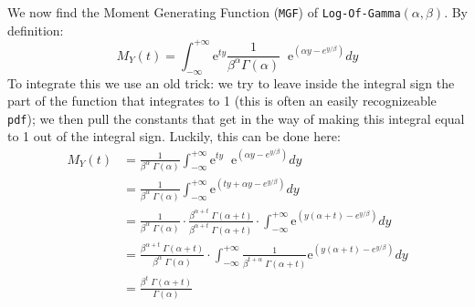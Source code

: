 \documentclass[12pt]{article}
\begin{document}
We now find the Moment Generating Function (\texttt{MGF}) of \texttt{Log-Of-Gamma}$(\alpha, \beta)$. By definition:
$$
M_Y(t) = \int_{-\infty}^{+\infty} \mathrm{e}^{ty} \frac{1}{\beta^\alpha \Gamma(\alpha)} \;\; \mathrm{e}^{\left(\alpha y - e^{y/\beta}\right)} dy
$$
To integrate this we use an old trick: we try to leave inside the integral sign the part of the function that integrates to 1 (this is often an easily recognizeable \texttt{pdf}); we then pull the constants that get in the way of making this integral equal to 1 out of the integral sign. Luckily, this can be done here:
\begin{align*}
M_Y(t) &= \frac{1}{\beta^\alpha \; \Gamma(\alpha)} \int_{-\infty}^{+\infty} \mathrm{e}^{ty} \;\; \mathrm{e}^{\left(\alpha y - e^{y/\beta}\right)} dy\\
&= \frac{1}{\beta^\alpha \; \Gamma(\alpha)} \int_{-\infty}^{+\infty} \mathrm{e}^{\left(ty +\alpha y - e^{y/\beta}\right)} dy\\
&= \frac{1}{\beta^\alpha \; \Gamma(\alpha)} \cdot \frac{\beta^{\alpha + t} \; \Gamma(\alpha + t)}{\beta^{\alpha + t} \; \Gamma(\alpha + t)} \cdot \int_{-\infty}^{+\infty} \mathrm{e}^{\left(y(\alpha + t) - e^{y/\beta}\right)} dy\\
&= \frac{ \beta^{\alpha + t} \; \Gamma(\alpha + t) }{\beta^\alpha \; \Gamma(\alpha)}  \cdot \int_{-\infty}^{+\infty} \frac{1}{\beta^{t+\alpha} \; \Gamma(\alpha + t)} \mathrm{e}^{\left(y(\alpha + t) - e^{y/\beta}\right)} dy\\
&= \frac{\beta^t \; \Gamma(\alpha + t)}{\Gamma(\alpha)} 
\end{align*}
\\
\end{document}
